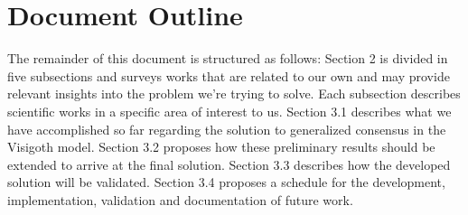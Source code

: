 \section{Document Outline}

The remainder of this document is structured as follows: Section 2 is divided in five subsections and surveys works that are related to our own and may provide relevant insights into the problem we're trying to solve. Each subsection describes scientific works in a specific area of interest to us. Section 3.1 describes what we have accomplished so far regarding the solution to generalized consensus in the Visigoth model. Section 3.2 proposes how these preliminary results should be extended to arrive at the final solution. Section 3.3 describes how the developed solution will be validated. Section 3.4 proposes a schedule for the development, implementation, validation and documentation of future work.
